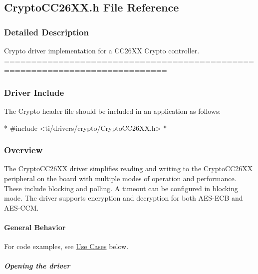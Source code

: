 \subsection{Crypto\-C\-C26\-X\-X.\-h File Reference}
\label{_crypto_c_c26_x_x_8h}


\subsubsection{Detailed Description}
Crypto driver implementation for a C\-C26\-X\-X Crypto controller. ============================================================================

\subsubsection*{Driver Include}

The Crypto header file should be included in an application as follows\-: 
\begin{DoxyCode}
*  #include <ti/drivers/crypto/CryptoCC26XX.h>
*  
\end{DoxyCode}


\subsubsection*{Overview}

The Crypto\-C\-C26\-X\-X driver simplifies reading and writing to the Crypto\-C\-C26\-X\-X peripheral on the board with multiple modes of operation and performance. These include blocking and polling. A timeout can be configured in blocking mode. The driver supports encryption and decryption for both A\-E\-S-\/\-E\-C\-B and A\-E\-S-\/\-C\-C\-M.

\paragraph*{General Behavior}

For code examples, see \hyperlink{_crypto_c_c26_x_x_8h_CRYPTO_USE_CASES}{Use Cases} below.

\subparagraph*{Opening the driver}


